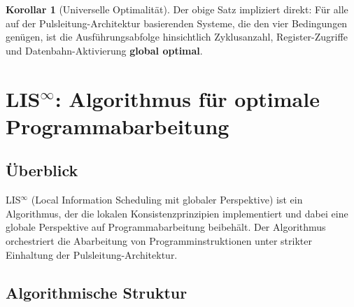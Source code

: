 \documentclass[a4paper,12pt]{article}
\theoremstyle{definition}
\newtheorem{korollar}{Korollar}
\begin{document}
\begin{korollar}[Universelle Optimalität]
	\label{kor:universal_optimal}
	Der obige Satz impliziert direkt: Für alle auf der Pulsleitung-Architektur basierenden Systeme, die den vier Bedingungen genügen, ist die Ausführungsabfolge hinsichtlich Zyklusanzahl, Register-Zugriffe und Datenbahn-Aktivierung \textbf{global optimal}.
\end{korollar}

\section[LIS-infty: Algorithmus für optimale Programmabarbeitung]{LIS$^{\infty}$: Algorithmus für optimale Programmabarbeitung}

\subsection{Überblick}

LIS$^{\infty}$ (Local Information Scheduling mit globaler Perspektive) ist ein Algorithmus, der die lokalen Konsistenzprinzipien implementiert und dabei eine globale Perspektive auf Programmabarbeitung beibehält. Der Algorithmus orchestriert die Abarbeitung von Programminstruktionen unter strikter Einhaltung der Pulsleitung-Architektur.

\subsection{Algorithmische Struktur}
\end{document}
